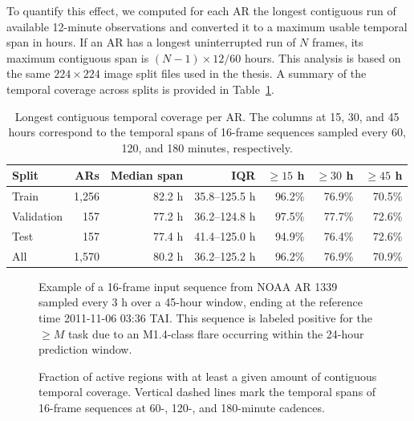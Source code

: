 To quantify this effect, we computed for each AR the longest contiguous run of available 12-minute observations and converted it to a maximum usable temporal span in hours. If an AR has a longest uninterrupted run of $N$ frames, its maximum contiguous span is $(N-1)\times 12/60$ hours. This analysis is based on the same $224 \times 224$ image split files used in the thesis. A summary of the temporal coverage across splits is provided in Table~\ref{tab:intro_ar_temporal_coverage}.

\begin{table}[H]
\centering
\caption{Longest contiguous temporal coverage per AR. The columns at 15, 30, and 45 hours correspond to the temporal spans of 16-frame sequences sampled every 60, 120, and 180 minutes, respectively.}
\label{tab:intro_ar_temporal_coverage}
\small
\renewcommand{\arraystretch}{1.15}
\setlength{\tabcolsep}{5pt}
\begin{tabular}{@{}lrrrrrr@{}}
\toprule
Split & ARs & Median span & IQR & $\geq 15$ h & $\geq 30$ h & $\geq 45$ h \\
\midrule
Train & 1,256 & 82.2 h & 35.8--125.5 h & 96.2\% & 76.9\% & 70.5\% \\
Validation & 157 & 77.2 h & 36.2--124.8 h & 97.5\% & 77.7\% & 72.6\% \\
Test & 157 & 77.4 h & 41.4--125.0 h & 94.9\% & 76.4\% & 72.6\% \\
All & 1,570 & 80.2 h & 36.2--125.2 h & 96.2\% & 76.9\% & 70.9\% \\
\bottomrule
\end{tabular}
\end{table}

\begin{figure}[H]
\centering
{}
\caption{Example of a 16-frame input sequence from NOAA AR 1339 sampled every 3 h over a 45-hour window, ending at the reference time 2011-11-06 03:36 TAI. This sequence is labeled positive for the $\geq M$ task due to an M1.4-class flare occurring within the 24-hour prediction window.}
\label{fig:example_180_sequence}
\end{figure}


\begin{figure}[H]
\centering
{}
\caption{Fraction of active regions with at least a given amount of contiguous temporal coverage. Vertical dashed lines mark the temporal spans of 16-frame sequences at 60-, 120-, and 180-minute cadences.}
\label{fig:intro_ar_temporal_coverage}
\end{figure}

